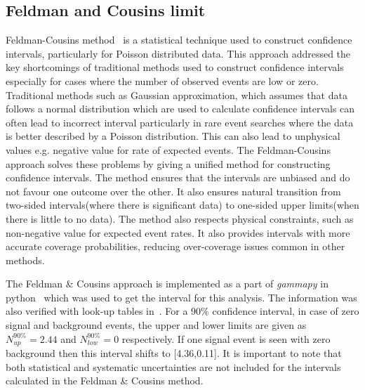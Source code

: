 \subsection{Feldman and Cousins limit}
\label{subsec:FandC}
Feldman-Cousins method~\cite{Feldman:1997qc} is a statistical technique used to construct confidence intervals, particularly for Poisson distributed data. This approach addressed the key shortcomings of traditional methods used to construct confidence intervals especially for cases where the number of observed events are low or zero. Traditional methods such as Gaussian approximation, which assumes that data follows a normal distribution which are used to calculate confidence intervals can often lead to incorrect interval particularly in rare event searches where the data is better described by a Poisson distribution. This can also lead to unphysical values e.g. negative value for rate of expected events. The Feldman-Cousins approach solves these problems by giving a unified method for constructing confidence intervals. The method ensures that the intervals are unbiased and do not favour one outcome over the other. It also ensures natural transition from two-sided intervals(where there is significant data) to one-sided upper limits(when there is little to no data). The method also respects physical constraints, such as non-negative value for expected event rates. It also provides intervals with more accurate coverage probabilities, reducing over-coverage issues common in other methods. 

The Feldman \& Cousins approach is implemented as a part of \textit{gammapy} in python~\cite{Gammapy:2023gvb} which was used  to get the interval for this analysis. The information was also verified with look-up tables in~\cite{Feldman:1997qc}. For a 90\% confidence interval, in case of zero signal and background events, the upper and lower limits are given as $N^{90\%}_{up} = 2.44$ and $N^{90\%}_{low} = 0$ respectively. If one signal event is seen with zero background then this interval shifts to [4.36,0.11]. It is important to note that both statistical and systematic uncertainties are not included for the intervals calculated in the Feldman \& Cousins method. 

